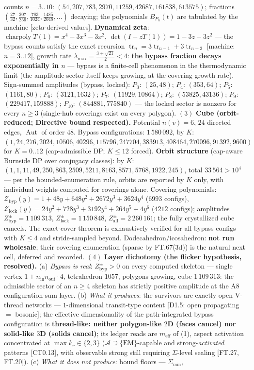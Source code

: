 \begin{theorem}
counts $n=3..10$: $(54,207,783,2970,11259,42687,161838,613575)$; fractions $(\tfrac{27}{32},\tfrac{207}{256},\tfrac{783}{1024},\tfrac{1485}{2048},\dots)$ decaying; the polynomials $B_{P_n}(t)$ are tabulated by the machine [zeta-derived values]. \textbf{Dynamical zeta}: $\operatorname{charpoly}T(1)=x^4-3x^3-3x^2$, $\det(I-zT(1))=1-3z-3z^2$ — the bypass counts satisfy the exact recursion $\operatorname{tr}_n=3\operatorname{tr}_{n-1}+3\operatorname{tr}_{n-2}$ [machine: $n=3..12$], growth rate $\lambda_{\max}=\tfrac{3+\sqrt{21}}2<4$: \textbf{the bypass fraction decays exponentially in $n$} — bypass is a finite-cell phenomenon in the thermodynamic limit (the amplitude sector itself keeps growing, at the covering growth rate). Sign-summed amplitudes (bypass, locked): $P_3$: $(25,48)$; $P_4$: $(353,64)$; $P_5$: $(1161,80)$; $P_6$: $(3121,1632)$; $P_7$: $(11929,10864)$; $P_8$: $(53825,43136)$; $P_9$: $(229417,159888)$; $P_{10}$: $(844881,775840)$ — the locked sector is nonzero for every $n\ge3$ (single-hub coverings exist on every polygon). $(3)$ \textbf{Cube (orbit-reduced; Directive bound respected).} Potential $n(v)=6$, $24$ directed edges, $\operatorname{Aut}$ of order $48$. Bypass configurations: $1\,580\,092$, by $K$: $(1,24,276,2024,10506,40296,115796,247704,383913,408464,270096,91392,9600)$ for $K=0..12$ (cap-admissible DP; $K\le12$ forced). \textbf{Orbit structure} (cap-aware Burnside DP over conjugacy classes): by $K$: $(1,1,11,49,250,863,2509,5211,8163,8571,5768,1922,245)$, total $33\,564>10^4$ — per the bounded-enumeration rule, orbits are reported by $K$ only, with individual weights computed for coverings alone. Covering polynomials: $\mathcal Z_{\mathrm{byp}}(y)=1+48y+648y^2+2672y^3+3624y^4$ ($6993$ configs), $\mathcal Z_{\mathrm{lock}}(y)=24y^2+728y^3+3192y^4+264y^5+4y^6$ ($4212$ configs); amplitudes $Z^{\pm}_{\mathrm{byp}}=1\,109\,313$, $Z^{\pm}_{\mathrm{lock}}=1\,150\,848$, $Z^{\pm}_{\mathrm{all}}=2\,260\,161$; the fully crystallized cube cancels. The exact-cover theorem is exhaustively verified for all bypass configs with $K\le4$ and stride-sampled beyond. Dodecahedron/icosahedron: \textbf{not run wholesale}; their covering enumeration (sparse by FT.67(3d)) is the natural next cell, deferred and recorded. $(4)$ \textbf{Layer dichotomy (the flicker hypothesis, resolved).} (a) \textit{Bypass is real}: $Z^{\pm}_{\mathrm{byp}}>0$ on every computed skeleton — single vertex $1+n_{\mathrm{in}}n_{\mathrm{out}}\cdot4$, tetrahedron $1057$, polygons growing, cube $1\,109\,313$: the admissible sector of an $n\ge4$ skeleton has strictly positive amplitude at the A8 configuration-sum layer. (b) \textit{What it produces}: the survivors are exactly open V-thread networks — $1$-dimensional transit-type content [D1.5: open propagating $=$ bosonic]; the effective dimensionality of the path-integrated bypass configuration is \textbf{thread-like: neither polygon-like $2$D (faces cancel) nor solid-like $3$D (solids cancel)}; its ledger reads are $m_{\mathrm{eff}}$ of (1), aspect activation concentrated at $\max k_v\in\{2,3\}$ ($\mathcal A\supseteq\{\mathrm{EM}\}$-capable and strong-\textit{activated} patterns [CT0.13], with observable strong still requiring $\Sigma$-level sealing [FT.27, FT.20]). (c) \textit{What it does not produce}: bound floors — $\Sigma_{\min}$, 
\end{theorem}
